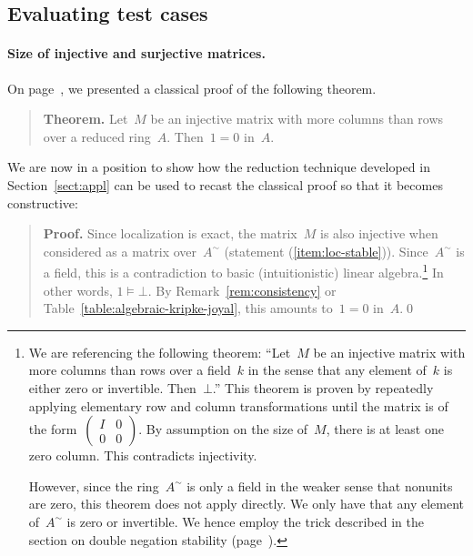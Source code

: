 \documentclass{ws-rv9x6}
\begin{document}
{\subsection{Evaluating test cases}
\label{sect:example-applications}

\paragraph{Size of injective and surjective matrices.}

On page~\pageref{par:appl-constr-alg}, we presented a classical proof of the
following theorem.\par
\begin{quote}
\textbf{Theorem.} Let~$M$ be an injective matrix with more columns than rows
over a reduced ring~$A$. Then~$1 = 0$ in~$A$.
\end{quote}
We are now in a position to show how the reduction technique developed in
Section~\ref{sect:appl} can be used to recast the classical proof so that it
becomes constructive:

\begin{quote}
\textbf{Proof.} Since localization is exact, the matrix~$M$ is also injective when
considered as a matrix over~$A^\sim$ (statement (\ref{item:loc-stable})).
Since~$A^\sim$ is a field, this is a contradiction to basic (intuitionistic)
linear algebra.\footnote{We are referencing the following theorem: ``Let~$M$ be
an injective matrix with more columns than rows over a field~$k$ in the sense
that any element of~$k$ is either zero or invertible. Then~$\bot$.'' This
theorem is proven by repeatedly applying elementary row and column
transformations until the matrix is of the
form~$\left(\begin{smallmatrix}I&0\\0&0\end{smallmatrix}\right)$. By assumption
on the size of~$M$, there is at least one zero column. This contradicts
injectivity.

However, since the ring~$A^\sim$ is only a field in the weaker sense that
nonunits are zero, this theorem does not apply directly. We only have that any
element of~$A^\sim$ is \notnot zero or invertible. We hence employ the
trick described in the section on double negation stability
(page~\pageref{par:double-negation-stability}).}
In other words, $1 \models \bot$. By
Remark~\ref{rem:consistency} or Table~\ref{table:algebraic-kripke-joyal}, this amounts to~$1 = 0$ in~$A$.\qed
\end{quote}

}
\end{document}
